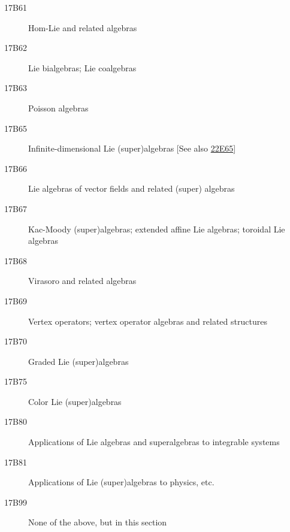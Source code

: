 \documentclass[letterpaper]{article}
\begin{document}
\begin{description}
\item [17B61]\label{17B61} Hom-Lie and related algebras
\item [17B62]\label{17B62} Lie bialgebras; Lie coalgebras
\item [17B63]\label{17B63} Poisson algebras
\item [17B65]\label{17B65} Infinite-dimensional Lie (super)algebras [See also \hyperref[22E65]{22E65}]
\item [17B66]\label{17B66} Lie algebras of vector fields and related (super) algebras
\item [17B67]\label{17B67} Kac-Moody (super)algebras; extended affine Lie algebras; toroidal Lie algebras
\item [17B68]\label{17B68} Virasoro and related algebras
\item [17B69]\label{17B69} Vertex operators; vertex operator algebras and related structures
\item [17B70]\label{17B70} Graded Lie (super)algebras
\item [17B75]\label{17B75} Color Lie (super)algebras
\item [17B80]\label{17B80} Applications of Lie algebras and superalgebras to integrable systems
\item [17B81]\label{17B81} Applications of Lie (super)algebras to physics, etc.
\item [17B99]\label{17B99} None of the above, but in this section
\end{description}
\end{document}
